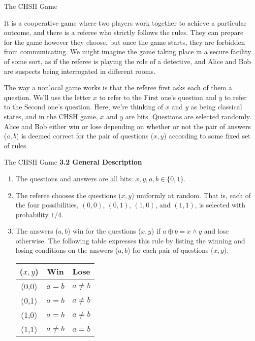 \documentclass[12pt, aspectratio=169]{beamer}
\begin{document}
\begin{frame}{The CHSH Game}


It is a cooperative game where two players work together to achieve a particular outcome, and there is a referee who strictly follows the rules. They can prepare for the game however they choose, but once the game starts, they are forbidden from communicating. We might imagine the game taking place in a secure facility of some sort, as if the referee is playing the role of a detective, and Alice and Bob are suspects being interrogated in different rooms.

The way a nonlocal game works is that the referee first asks each of them a question. We'll use the letter \(x\) to refer to the First one’s question and \(y\) to refer to the Second one’s question. Here, we're thinking of \(x\) and \(y\) as being classical states, and in the CHSH game, \(x\) and \(y\) are bits. Questions are selected randomly. Alice and Bob either win or lose depending on whether or not the pair of answers (\(a,b\)) is deemed correct for the pair of questions (\(x,y\)) according to some fixed set of rules.
\end{frame}
\begin{frame}{The CHSH Game}
\textbf{3.2 General Description}

\begin{enumerate}
    \item The questions and answers are all bits: \(x, y, a, b \in \{0,1\}\).
    \item The referee chooses the questions (\(x, y\)) uniformly at random. That is, each of the four possibilities, \((0,0)\), \((0,1)\), \((1,0)\), and \((1,1)\), is selected with probability \(1/4\).
    \item The answers (\(a, b\)) win for the questions (\(x, y\)) if \(a \oplus b = x \land y\) and lose otherwise. The following table expresses this rule by listing the winning and losing conditions on the answers (\(a, b\)) for each pair of questions (\(x, y\)).

\begin{center}
    \begin{tabular}{c|c|c}
        (\(x,y\)) & Win & Lose \\
        \hline
        (0,0) & \(a=b\) & \(a \neq b\) \\
        (0,1) & \(a=b\) & \(a \neq b\) \\
        (1,0) & \(a=b\) & \(a \neq b\) \\
        (1,1) & \(a \neq b\) & \(a=b\) \\
    \end{tabular}
\end{center}

\end{enumerate}

\end{frame}
\end{document}
